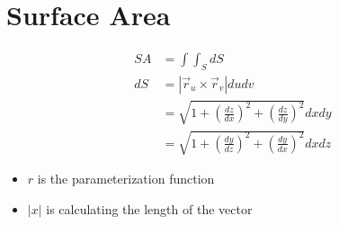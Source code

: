 \section{Surface Area}

  \begin{align}
    SA
      &= \int \int_{S} dS \\
    dS
      &= \left| \vec{r}_{u} \times \vec{r}_{v} \right| du dv \\
      &= \sqrt{1 + \left( \frac{dz}{dx} \right)^{2} + \left( \frac{dz}{dy} \right)^{2}} dx dy \\
      &= \sqrt{1 + \left( \frac{dy}{dz} \right)^{2} + \left( \frac{dy}{dx} \right)^{2}} dx dz
  \end{align}

  \begin{itemize}
    \item $ r $ is the parameterization function
    \item $ \left| x \right| $ is calculating the length of the vector
  \end{itemize}